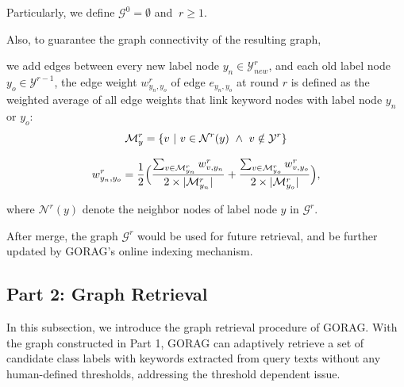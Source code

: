 Particularly, we define $\mathcal{G}^0=\emptyset$ and $\ r\geq 1$. 

Also, to guarantee the graph connectivity of the resulting graph, 

we add edges between every new label node $y_{n}\in \mathcal{Y}_{new}^r$, 
and each old label node $y_{o}\in \mathcal{Y}^{r-1}$, 
the edge weight $w_{y_n,y_o}^r$ of edge $e_{y_n,y_o}$ at round $r$ is defined as the weighted average of all edge weights that link keyword nodes with label node $y_n$ or $y_o$: 
\vspace{-3px}
\begin{equation}
	\vspace{-5px}
	\mathcal{M}_y^r=\{v\ |\ v\in \mathcal{N}^r(y)\ \land\ v\notin \mathcal{Y}^r\}
	\vspace{-5px}
\end{equation}

\begin{equation}
	\vspace{-3px}
	w_{y_n,y_o}^r=\frac{1}{2}\Big(\frac{\sum_{v\in \mathcal{M}_{y_n}^r}w_{v,y_n}^r}{2\times|\mathcal{M}_{y_n}^r|}+\frac{\sum_{v\in \mathcal{M}_{y_o}^r}w_{v,y_o}^r}{2\times|\mathcal{M}_{y_o}^r|}\Big),
	
\end{equation}




\noindent where $\mathcal{N}^r(y)$ denote the neighbor nodes of label node $y$ in $\mathcal{G}^r$.



After merge, the graph $\mathcal{G}^r$ would be used for future retrieval, and be further updated by GORAG's online indexing mechanism.





\subsection{Part 2: Graph Retrieval}\label{sec:gr}



	In this subsection, we introduce the graph retrieval procedure of GORAG. With the graph constructed in Part 1, GORAG can adaptively retrieve a set of candidate class labels with keywords extracted from query texts without any human-defined thresholds, addressing the threshold dependent issue.


